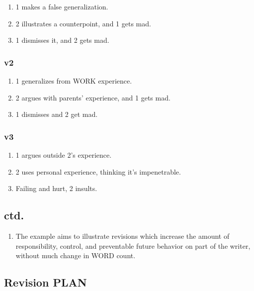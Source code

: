 \documentclass[
]{book}
\providecommand{\tightlist}{%
  \setlength{\itemsep}{0pt}\setlength{\parskip}{0pt}}
\begin{document}
\begin{enumerate}
\def\labelenumi{\alph{enumi})}
\tightlist
\item
  1 makes a false generalization.
\item
  2 illustrates a counterpoint, and 1 gets mad.
\item
  1 dismisses it, and 2 gets mad.
\end{enumerate}

\hypertarget{v2}{%
\subsubsection{v2}\label{v2}}

\begin{enumerate}
\def\labelenumi{\alph{enumi})}
\tightlist
\item
  1 generalizes from WORK experience.
\item
  2 argues with parents' experience, and 1 gets mad.
\item
  1 dismisses and 2 get mad.
\end{enumerate}

\hypertarget{v3}{%
\subsubsection{v3}\label{v3}}

\begin{enumerate}
\def\labelenumi{\alph{enumi})}
\tightlist
\item
  1 argues outside 2's experience.
\item
  2 uses personal experience, thinking it's impenetrable.
\item
  Failing and hurt, 2 insults.
\end{enumerate}

\hypertarget{ctd.}{%
\subsection{ctd.}\label{ctd.}}

\begin{enumerate}
\def\labelenumi{\arabic{enumi}.}
\setcounter{enumi}{27}
\tightlist
\item
  The example aims to illustrate revisions which increase the amount of
  responsibility, control, and preventable future behavior on part of the
  writer, without much change in WORD count.
\end{enumerate}

\hypertarget{revision-plan}{%
\subsection{Revision PLAN}\label{revision-plan}}
\end{document}
